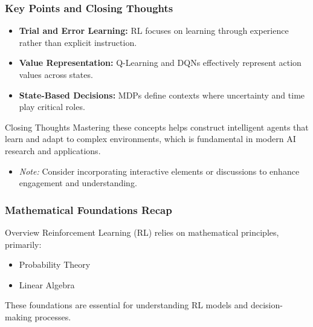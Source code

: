 \documentclass[aspectratio=169]{beamer}
\begin{document}
\begin{frame}[fragile]
    \frametitle{Key Points and Closing Thoughts}
    \begin{itemize}
        \item \textbf{Trial and Error Learning:} RL focuses on learning through experience rather than explicit instruction.
        \item \textbf{Value Representation:} Q-Learning and DQNs effectively represent action values across states.
        \item \textbf{State-Based Decisions:} MDPs define contexts where uncertainty and time play critical roles.
    \end{itemize}
    
    \begin{block}{Closing Thoughts}
        Mastering these concepts helps construct intelligent agents that learn and adapt to complex environments, which is fundamental in modern AI research and applications.
    \end{block}

    \begin{itemize}
        \item \textit{Note:} Consider incorporating interactive elements or discussions to enhance engagement and understanding.
    \end{itemize}
\end{frame}

\begin{frame}[fragile]
    \frametitle{Mathematical Foundations Recap}
    \begin{block}{Overview}
        Reinforcement Learning (RL) relies on mathematical principles, primarily:
        \begin{itemize}
            \item Probability Theory
            \item Linear Algebra
        \end{itemize}
        These foundations are essential for understanding RL models and decision-making processes.
    \end{block}
\end{frame}
\end{document}

